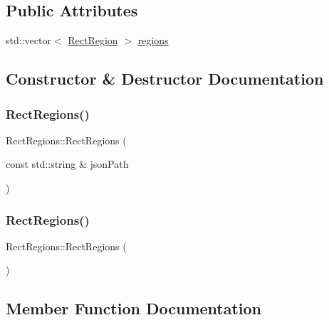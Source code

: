 \subsection*{Public Attributes}
\begin{DoxyCompactItemize}
\item 
std\+::vector$<$ \hyperlink{struct_rect_region}{Rect\+Region} $>$ \hyperlink{struct_rect_regions_a213237dc4a98b5d77d76c3992d533694}{regions}
\end{DoxyCompactItemize}


\subsection{Constructor \& Destructor Documentation}
\mbox{\label{struct_rect_regions_a75fc4850d7b8caee61164658e47832fb}} 
\subsubsection{\texorpdfstring{Rect\+Regions()}{RectRegions()}\hspace{0.1cm}{\footnotesize\ttfamily [1/2]}}
{\footnotesize\ttfamily Rect\+Regions\+::\+Rect\+Regions (\begin{DoxyParamCaption}\item[{const std\+::string \&}]{json\+Path }\end{DoxyParamCaption})}

\mbox{\label{struct_rect_regions_af0c705b56314b41a80970fcd826b0600}} 
\subsubsection{\texorpdfstring{Rect\+Regions()}{RectRegions()}\hspace{0.1cm}{\footnotesize\ttfamily [2/2]}}
{\footnotesize\ttfamily Rect\+Regions\+::\+Rect\+Regions (\begin{DoxyParamCaption}{ }\end{DoxyParamCaption})}



\subsection{Member Function Documentation}
\mbox{\label{struct_rect_regions_a949e327f668e731868a853b6331761be}} 
